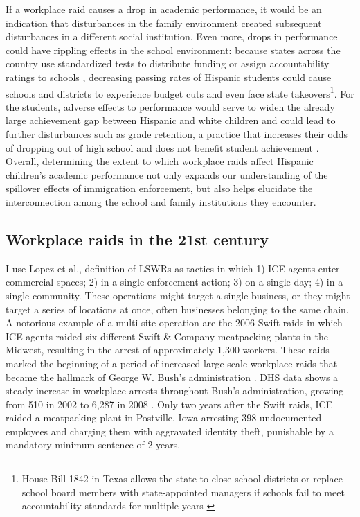 \documentclass[hidelinks,twoside]{article}
\begin{document}
If a workplace raid causes a drop in academic performance, it would be an indication that disturbances in the family environment created subsequent disturbances in a different social institution. Even more, drops in performance could have rippling effects in the school environment: because states across the country use standardized tests to distribute funding or assign accountability ratings to schools \citep{evans_2018_when}, decreasing passing rates of Hispanic students could cause schools and districts to experience budget cuts and even face state takeovers\footnote{House Bill 1842 in Texas allows the state to close school districts or replace school board members with state-appointed managers if schools fail to meet accountability standards for multiple years \citep{evans_2018_when}}. For the students, adverse effects to performance would serve to widen the already large achievement gap between Hispanic and white children \citep{reardon_2009_the} and could lead to further disturbances such as grade retention, a practice that increases their odds of dropping out of high school and does not benefit student achievement \citep{hughes_2018_effect,allen_2009_quality}. Overall, determining the extent to which workplace raids affect Hispanic children’s academic performance not only expands our understanding of the spillover effects of immigration enforcement, but also helps elucidate the interconnection among the school and family institutions they encounter.


\subsection*{Workplace raids in the 21st century}

I use Lopez et al., \citeyearpar{lopez_2022_largescale} definition of LSWRs as tactics in which 1) ICE agents enter commercial spaces; 2) in a single enforcement action; 3) on a single day; 4) in a single community. These operations might target a single business, or they might target a series of locations at once, often businesses belonging to the same chain. A notorious example of a multi-site operation are the 2006 Swift raids in which ICE agents raided six different Swift \& Company meatpacking plants in the Midwest, resulting in the arrest of approximately 1,300 workers. These raids marked the beginning of a period of increased large-scale workplace raids that became the hallmark of George W. Bush’s administration \citep{chertoff_2006_press}. DHS data shows a steady increase in workplace arrests throughout Bush’s administration, growing from 510 in 2002 to 6,287 in 2008 \citep{jonescorrea_2009_immigration}. Only two years after the Swift raids, ICE raided a meatpacking plant in Postville, Iowa arresting 398 undocumented employees and charging them with aggravated identity theft, punishable by a mandatory minimum sentence of 2 years.
\end{document}
